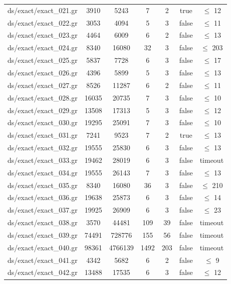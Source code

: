 \documentclass{standalone}
\begin{document}
\begin{tabular}{|c|c|c|c|c|c|c|}
ds/exact/exact\_021.gr & 3910  &  5243   &  7    &  2   &  true  & $\leq $ 12  \\
ds/exact/exact\_022.gr & 3053  &  4094   &  5    &  3   &  false & $\leq $ 11  \\
ds/exact/exact\_023.gr & 4464  &  6009   &  6    &  2   &  false & $\leq $ 13  \\
ds/exact/exact\_024.gr & 8340  &  16080  &  32   &  3   &  false & $\leq $ 203 \\
ds/exact/exact\_025.gr & 5837  &  7728   &  6    &  3   &  false & $\leq $ 17  \\
ds/exact/exact\_026.gr & 4396  &  5899   &  5    &  3   &  false & $\leq $ 13  \\
ds/exact/exact\_027.gr & 8526  &  11287  &  6    &  2   &  false & $\leq $ 11  \\
ds/exact/exact\_028.gr & 16035 & 20735   &  7    &  3   &  false & $\leq $ 10  \\
ds/exact/exact\_029.gr & 13508 & 17313   &  5    &  3   &  false & $\leq $ 12  \\
ds/exact/exact\_030.gr & 19295 & 25091   &  7    &  3   &  false & $\leq $ 10  \\
ds/exact/exact\_031.gr & 7241  & 9523    &  7    &  2   &  true  & $\leq $ 13  \\
ds/exact/exact\_032.gr & 19555 & 25830   &  6    &  3   &  false & $\leq $ 13  \\
ds/exact/exact\_033.gr & 19462 & 28019   &  6    &  3   &  false & timeout     \\
ds/exact/exact\_034.gr & 19555 & 26143   &  7    &  3   &  false & $\leq $ 13  \\
ds/exact/exact\_035.gr & 8340  & 16080   &  36   &  3   &  false & $\leq $ 210 \\
ds/exact/exact\_036.gr & 19638 & 25873   &  6    &  3   &  false & $\leq $ 14  \\
ds/exact/exact\_037.gr & 19925 & 26909   &  6    &  3   &  false & $\leq $ 23  \\
ds/exact/exact\_038.gr & 3570  & 44481   &  109  &  39  &  false & timeout     \\
ds/exact/exact\_039.gr & 74491 & 728776  &  155  &  56  &  false & timeout     \\
ds/exact/exact\_040.gr & 98361 & 4766139 &  1492 &  203 &  false & timeout     \\
ds/exact/exact\_041.gr & 4342  & 5682    &  6    &  2   &  false & $\leq $ 9   \\
ds/exact/exact\_042.gr & 13488 & 17535   &  6    &  3   &  false & $\leq $ 12  \\

\end{tabular}
\end{document}
